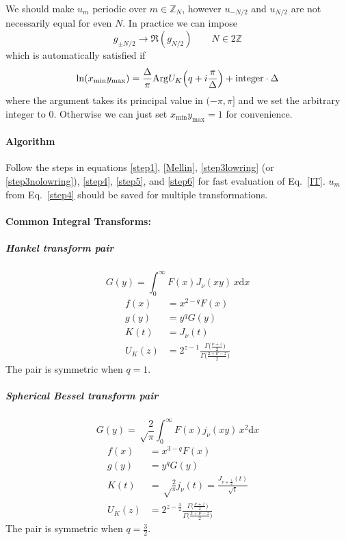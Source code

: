 \documentclass{article}
\renewcommand{\d}{\mathrm{d}}
\newcommand{\xmin}{x_\mathrm{min}}
\newcommand{\ymax}{y_\mathrm{max}}
\newcommand{\Mellin}{U}
\begin{document}
We should make $u_m$ periodic over $m\in\mathbb{Z}_N$, however
$u_{-N/2}$ and $u_{N/2}$ are not necessarily equal for even $N$.
In practice we can impose
\begin{equation}
    \label{step3nolowring}
    g_{\pm N/2} \to \Re(g_{N/2}) \qquad N\in2\mathbb{Z}
\end{equation}
which is automatically satisfied if
\begin{equation}
    \label{step3lowring}
    \ln(\xmin\ymax) = \frac\Delta\pi \mathrm{Arg} \Mellin_K\Bigl(q+i\frac\pi\Delta\Bigr)
    + \mathrm{integer} \cdot \Delta
\end{equation}
where the argument takes its principal value in $(-\pi,\pi]$
and we set the arbitrary integer to 0.
Otherwise we can just set $\xmin\ymax=1$ for convenience.


\paragraph{Algorithm}
Follow the steps in equations \eqref{step1}, \eqref{Mellin},
\eqref{step3lowring} (or \eqref{step3nolowring}), \eqref{step4}, \eqref{step5},
and \eqref{step6} for fast evaluation of Eq.~\eqref{IT}.
$u_m$ from Eq.~\eqref{step4} should be saved for multiple transformations.


\paragraph{Common Integral Transforms:}


\subparagraph{Hankel transform pair}
\begin{equation}
    G(y) = \int_0^\infty F(x) J_\nu(xy) \,x\d x
\end{equation}
\begin{align}
    f(x) &= x^{2-q}F(x) \\
    g(y) &= y^q G(y) \\
    K(t) &= J_\nu(t) \\
    \Mellin_K(z) &= 2^{z-1} \frac{\Gamma\bigl(\frac{\nu+z}2\bigr)}{\Gamma\bigl(\frac{2+\nu-z}2\bigr)}
\end{align}
The pair is symmetric when $q=1$.


\subparagraph{Spherical Bessel transform pair}
\begin{equation}
    G(y) = \sqrt\frac2\pi \int_0^\infty F(x) j_\nu(xy) \,x^2\d x
\end{equation}
\begin{align}
    f(x) &= x^{3-q} F(x) \\
    g(y) &= y^q G(y) \\
    K(t) &= \sqrt\frac2\pi j_\nu(t) = \frac{J_{\nu+\frac12}(t)}{\sqrt t} \\
    \Mellin_K(z) &= 2^{z-\frac32} \frac{\Gamma\bigl(\frac{\nu+z}2\bigr)}{\Gamma\bigl(\frac{3+\nu-z}2\bigr)}
\end{align}
The pair is symmetric when $q=\frac32$.
\end{document}
